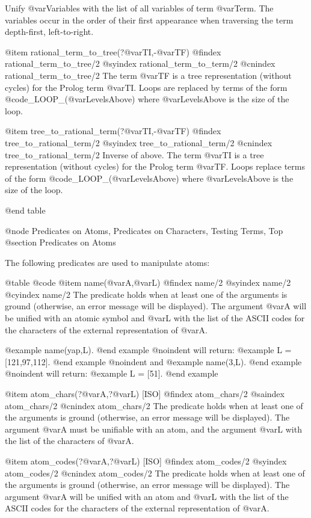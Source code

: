 {{{{Unify @var{Variables} with the list of all variables of term
@var{Term}.  The variables occur in the order of their first
appearance when traversing the term depth-first, left-to-right.

@item rational_term_to_tree(?@var{TI},-@var{TF})
@findex rational_term_to_tree/2
@syindex rational_term_to_term/2
@cnindex rational_term_to_tree/2
The term @var{TF} is a tree representation (without cycles) for the
 Prolog term @var{TI}. Loops are replaced by terms of the form
 @code{_LOOP_(@var{LevelsAbove})} where @var{LevelsAbove} is the size of
 the loop.

@item tree_to_rational_term(?@var{TI},-@var{TF})
@findex tree_to_rational_term/2
@syindex tree_to_rational_term/2
@cnindex tree_to_rational_term/2
Inverse of above. The term @var{TI} is a tree representation (without
 cycles) for the Prolog term @var{TF}. Loops replace terms of the form
 @code{_LOOP_(@var{LevelsAbove})} where @var{LevelsAbove} is the size of
 the loop.


@end table

@node Predicates on Atoms, Predicates on Characters, Testing Terms, Top
@section Predicates on Atoms

The following predicates are used to manipulate atoms:

@table @code
@item name(@var{A},@var{L})
@findex name/2
@syindex name/2
@cyindex name/2
The predicate holds when at least one of the arguments is ground
(otherwise, an error message will be displayed). The argument @var{A} will
be unified with an atomic symbol and @var{L} with the list of the ASCII
codes for the characters of the external representation of @var{A}.

@example
 name(yap,L).
@end example
@noindent
will return:
@example
 L = [121,97,112].
@end example
@noindent
and
@example
 name(3,L).
@end example
@noindent
will return:
@example
 L = [51].
@end example

@item atom_chars(?@var{A},?@var{L}) [ISO]
@findex atom_chars/2
@saindex atom_chars/2
@cnindex atom_chars/2
The predicate holds when at least one of the arguments is ground
(otherwise, an error message will be displayed). The argument @var{A} must
be unifiable with an atom, and the argument @var{L} with the list of the
characters of @var{A}.

@item atom_codes(?@var{A},?@var{L}) [ISO]
@findex atom_codes/2
@syindex atom_codes/2
@cnindex atom_codes/2
The predicate holds when at least one of the arguments is ground
(otherwise, an error message will be displayed). The argument @var{A} will
be unified with an atom and @var{L} with the list of the ASCII
codes for the characters of the external representation of @var{A}.

}}}}
